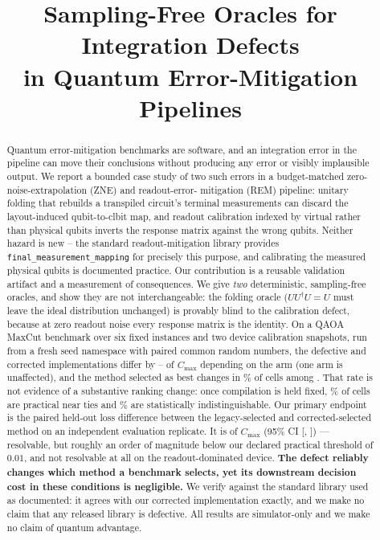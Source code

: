 \documentclass[10pt,conference]{IEEEtran}
\newcommand{\code}[1]{\texttt{\small #1}}
\begin{document}
\title{Sampling-Free Oracles for Integration Defects\\
in Quantum Error-Mitigation Pipelines}

\author{
}

\maketitle

\begin{abstract}
Quantum error-mitigation benchmarks are software, and an integration error in the pipeline can move
their conclusions without producing any error or visibly implausible output. We report a bounded
case study of two such errors in a budget-matched zero-noise-extrapolation (ZNE) and readout-error-%
mitigation (REM) pipeline: unitary folding that rebuilds a transpiled circuit's terminal measurements
can discard the layout-induced qubit-to-clbit map, and readout calibration indexed by virtual rather
than physical qubits inverts the response matrix against the wrong qubits. Neither hazard is new --
the standard readout-mitigation library provides \code{final\_measurement\_mapping} for precisely
this purpose, and calibrating the measured physical qubits is documented practice. Our contribution
is a reusable validation artifact and a measurement of consequences. We give \emph{two} deterministic,
sampling-free oracles, and show they are not interchangeable: the folding oracle
($UU^{\dagger}U=U$ must leave the ideal distribution unchanged) is provably blind to the calibration
defect, because at zero readout noise every response matrix is the identity. On a QAOA MaxCut
benchmark over six fixed instances and two device calibration snapshots, run from a fresh seed
namespace with paired common random numbers, the defective and corrected implementations differ by
\FONeminDis--\FONemaxDis{} of $C_{\max}$ depending on the arm (one arm is unaffected), and the
method selected as best changes in \FlipRateAllPct\% of cells among \WinnerScope. That rate is
not evidence of a substantive ranking change: once compilation is held fixed,
\TiePracticalAllPct\% of cells are practical near ties and \TieStatAllPct\% are statistically
indistinguishable. Our primary endpoint is the paired held-out loss difference between the
legacy-selected and corrected-selected method on an independent evaluation replicate. It is
\HeldOutDelta{} of $C_{\max}$ (95\% CI [\HeldOutLo, \HeldOutHi]) --- resolvable, but roughly an
order of magnitude below our declared practical threshold of $0.01$, and not resolvable at all on
the readout-dominated device. \textbf{The defect reliably changes which method a benchmark selects,
yet its downstream decision cost in these conditions is negligible.} We verify
against the standard library used as documented: it agrees with our corrected implementation
exactly, and we make no claim that any released library is defective. All results are
simulator-only and we make no claim of quantum advantage.
\end{abstract}
\end{document}
